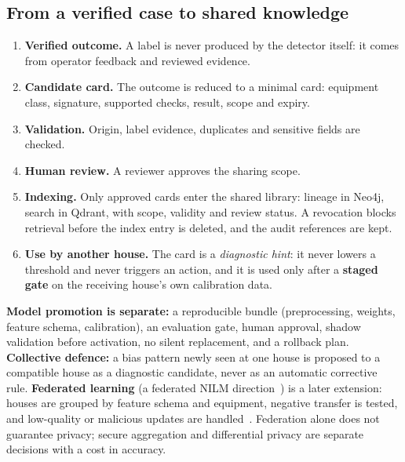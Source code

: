 \subsection{From a verified case to shared knowledge}
\begin{enumerate}[leftmargin=1.6em]
\item \textbf{Verified outcome.} A label is never produced by the detector itself: it comes from operator feedback and reviewed evidence.
\item \textbf{Candidate card.} The outcome is reduced to a minimal card: equipment class, signature, supported checks, result, scope and expiry.
\item \textbf{Validation.} Origin, label evidence, duplicates and sensitive fields are checked.
\item \textbf{Human review.} A reviewer approves the sharing scope.
\item \textbf{Indexing.} Only approved cards enter the shared library: lineage in Neo4j, search in Qdrant, with scope, validity and review status. A revocation blocks retrieval before the index entry is deleted, and the audit references are kept.
\item \textbf{Use by another house.} The card is a \emph{diagnostic hint}: it never lowers a threshold and never triggers an action, and it is used only after a \textbf{staged gate} on the receiving house's own calibration data.
\end{enumerate}
\textbf{Model promotion is separate:} a reproducible bundle (preprocessing, weights, feature schema, calibration), an evaluation gate, human approval, shadow validation before activation, no silent replacement, and a rollback plan. \textbf{Collective defence:} a bias pattern newly seen at one house is proposed to a compatible house as a diagnostic candidate, never as an automatic corrective rule. \textbf{Federated learning} (a federated NILM direction~\cite{fedtp}) is a later extension: houses are grouped by feature schema and equipment, negative transfer is tested, and low-quality or malicious updates are handled~\cite{fedavg}. Federation alone does not guarantee privacy; secure aggregation and differential privacy are separate decisions with a cost in accuracy.

